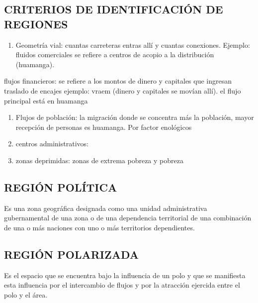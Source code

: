 \documentclass[
  a4paper,
]{article}
\providecommand{\tightlist}{%
  \setlength{\itemsep}{0pt}\setlength{\parskip}{0pt}}\usepackage{longtable,booktabs,array}
\begin{document}
\hypertarget{criterios-de-identificaciuxf3n-de-regiones}{%
\subsection{CRITERIOS DE IDENTIFICACIÓN DE
REGIONES}\label{criterios-de-identificaciuxf3n-de-regiones}}

\begin{enumerate}
\def\labelenumi{\arabic{enumi}.}
\tightlist
\item
  Geometría vial: cuantas carreteras entras allí y cuantas conexiones.
  Ejemplo: fluidos comerciales se refiere a centros de acopio a la
  distribución (huamanga).
\end{enumerate}

flujos financieros: se refiere a los montos de dinero y capitales que
ingresan traslado de encajes ejemplo: vraem (dinero y capitales se
movían allí). el flujo principal está en huamanga

\begin{enumerate}
\def\labelenumi{\arabic{enumi}.}
\setcounter{enumi}{1}
\tightlist
\item
  Flujos de población: la migración donde se concentra más la población,
  mayor recepción de personas es huamanga. Por factor enológicos
\item
  centros administrativos:
\item
  zonas deprimidas: zonas de extrema pobreza y pobreza
\end{enumerate}

\hypertarget{regiuxf3n-poluxedtica}{%
\subsection{REGIÓN POLÍTICA}\label{regiuxf3n-poluxedtica}}

Es una zona geográfica designada como una unidad administrativa
gubernamental de una zona o de una dependencia territorial de una
combinación de una o más naciones con uno o más territorios
dependientes.

\hypertarget{regiuxf3n-polarizada}{%
\subsection{REGIÓN POLARIZADA}\label{regiuxf3n-polarizada}}

Es el espacio que se encuentra bajo la influencia de un polo y que se
manifiesta esta influencia por el intercambio de flujos y por la
atracción ejercida entre el polo y el área.
\end{document}

